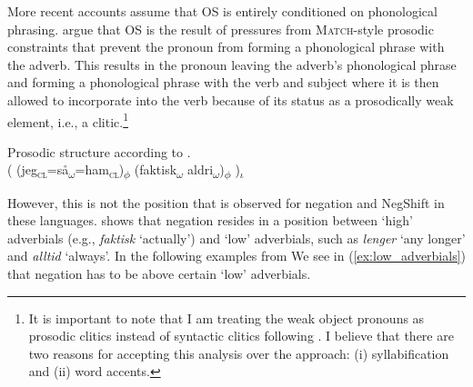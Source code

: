 \documentclass[12pt, letterpaper]{article}
\newcommand{\sub}[1]{\textsubscript{#1}}
\begin{document}
More recent accounts \citep[e.g.,][]{erteschik-shirVariationMainlandScandinavian2020,brinkerhoffMATCHINGPhrasesNorwegian2021} assume that OS is entirely conditioned on phonological phrasing. \citet{brinkerhoffMATCHINGPhrasesNorwegian2021} argue that OS is the result of pressures from \textsc{Match}-style prosodic constraints \citep{selkirkClauseIntonationalPhrase2009,selkirkSyntaxPhonologyInterface2011} that prevent the pronoun from forming a phonological phrase with the adverb. This results in the pronoun leaving the adverb's phonological phrase and forming a phonological phrase with the verb and subject where it is then allowed to incorporate into the verb because of its status as a prosodically weak element, i.e., a clitic.\footnote{It is important to note that I am treating the weak object pronouns as prosodic clitics instead of syntactic clitics following \citet{cardinalettiTypologyStructuralDeficiency1999}. I believe that there are two reasons for accepting this analysis over the \citeauthor{cardinalettiTypologyStructuralDeficiency1999} approach: (i) syllabification and (ii) word accents.} 

\ea Prosodic structure according to \citet{brinkerhoffMATCHINGPhrasesNorwegian2021}.\\
( (jeg\sub{\textsc{cl}}=så\sub{$\omega$}=ham\sub{\textsc{cl}})\sub{$\phi$} (faktisk\sub{$\omega$} aldri\sub{$\omega$})\sub{$\phi$} )\sub{$\iota$}
\z 

However, this is not the position that is observed for negation and NegShift in these languages. \citet{nilsenAdverbsAshift1997} shows that negation resides in a position between `high' adverbials (e.g., \emph{faktisk} `actually') and `low' adverbials, such as \emph{lenger} `any longer' and \emph{alltid} `always'. In the following examples from \citet{nilsenAdverbsAshift1997} We see in (\ref{ex:low_adverbials}) that negation has to be above certain `low' adverbials.
\end{document}
